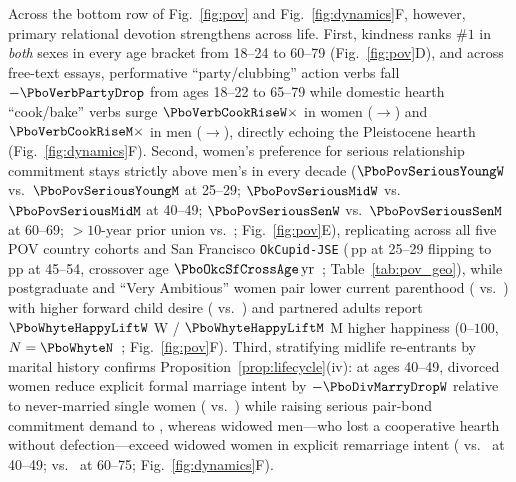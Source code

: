 Across the bottom row of Fig.~\ref{fig:pov} and Fig.~\ref{fig:dynamics}F, however, primary relational devotion strengthens across life. First, kindness ranks $\#1$ in \emph{both} sexes in every age bracket from 18--24 to 60--79 (Fig.~\ref{fig:pov}D), and across \PboVoiceEssaysN{} free-text essays, performative ``party/clubbing'' action verbs fall $-\PboVerbPartyDrop$ from ages 18--22 to 65--79 while domestic hearth ``cook/bake'' verbs surge $\PboVerbCookRiseW\times$ in women (\PboVerbCookYoungW{}$\to$\PboVerbCookOldW{}) and $\PboVerbCookRiseM\times$ in men (\PboVerbCookYoungM{}$\to$\PboVerbCookOldM{}), directly echoing the Pleistocene hearth (Fig.~\ref{fig:dynamics}F). Second, women's preference for serious relationship commitment stays strictly above men's in every decade ($\PboPovSeriousYoungW$ vs.\ $\PboPovSeriousYoungM$ at 25--29; $\PboPovSeriousMidW$ vs.\ $\PboPovSeriousMidM$ at 40--49; $\PboPovSeriousSenW$ vs.\ $\PboPovSeriousSenM$ at 60--69; $>10$-year prior union \PboPovTenYrMidW{} vs.\ \PboPovTenYrMidM; Fig.~\ref{fig:pov}E), replicating across all five POV country cohorts and San Francisco \texttt{OkCupid-JSE} (\PboOkcSfGapYoung\,pp at 25--29 flipping to \PboOkcSfGapOlder\,pp at 45--54, crossover age $\PboOkcSfCrossAge\,\mathrm{yr}$~\cite{kim2015}; Table~\ref{tab:pov_geo}), while postgraduate and ``Very Ambitious'' women pair lower current parenthood (\PboPovAmbParentHighW{} vs.\ \PboPovAmbParentLowW) with higher forward child desire (\PboPovAmbWantHighW{} vs.\ \PboPovAmbWantLowW) and partnered adults report $\PboWhyteHappyLiftW$ W / $\PboWhyteHappyLiftM$ M higher happiness ($0$--$100$, $N=\PboWhyteN$~\cite{whyte2021}; Fig.~\ref{fig:pov}F). Third, stratifying midlife re-entrants by marital history confirms Proposition~\ref{prop:lifecycle}(iv): at ages 40--49, divorced women reduce explicit formal marriage intent by $-\PboDivMarryDropW$ relative to never-married single women (\PboDivMarryMidW{} vs.\ \PboSinMarryMidW{}) while raising serious pair-bond commitment demand to \PboDivSeriousMidW{}, whereas widowed men---who lost a cooperative hearth without defection---exceed widowed women in explicit remarriage intent (\PboWidMarryMidM{} vs.\ \PboWidMarryMidW{} at 40--49; \PboWidMarrySenM{} vs.\ \PboWidMarrySenW{} at 60--75; Fig.~\ref{fig:dynamics}F).

